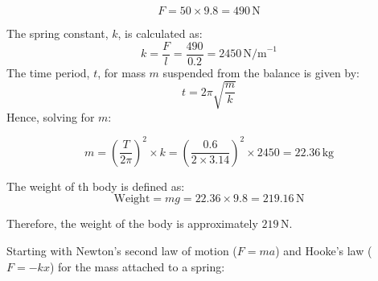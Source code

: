 \documentclass[journal,12pt,twocolumn]{IEEEtran}
\theoremstyle{remark}
\begin{document}
	\begin{equation}
F = 50 \times 9.8 = 490 \, \text{N}
	\end{equation}





The spring constant, \( k \), is calculated as:
\begin{equation}
k = \frac{F}{l} = \frac{490}{0.2} = 2450 \, \text{N/m}^{-1}
\end{equation}
The time period, \( t \), for mass \( m \) suspended from the balance is given by:
\begin{equation}
t = 2\pi\sqrt{\frac{m}{k}}
\end{equation}
Hence, solving for \( m \):

\begin{equation}
m = \left(\frac{T}{2\pi}\right)^2 \times k = \left(\frac{0.6}{2 \times 3.14}\right)^2 \times 2450 = 22.36 \, \text{kg}
\end{equation}

The weight of th body is defined as:
\begin{equation}
\text{Weight} = mg = 22.36 \times 9.8 = 219.16 \, \text{N}
\end{equation}

Therefore, the weight of the body is approximately \(219 \, \text{N}\).
	
	\vspace{2cm}

	Starting with Newton's second law of motion ($F = ma$) and Hooke's law ($F = -kx$) for the mass attached to a spring:
\end{document}
